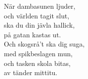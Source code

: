 \vspace{10pt}
När dambasunen ljuder,\\
och världen tagit slut,\\
ska du din jävla hallick,\\
på gatan kastas ut.\\
Och skogsrå't ska dig suga,\\
med spikbeslagen mun,\\
och tasken skola bitas,\\
av tänder mittitu.

